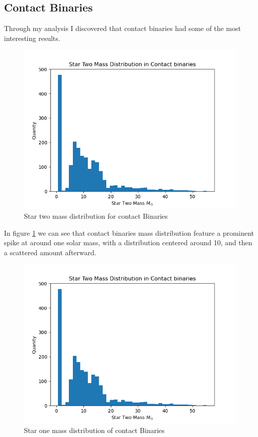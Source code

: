 \documentclass[12pt, a4paper]{article}
\begin{document}
        \subsection{\centering Contact Binaries}
            Through my analysis I discovered that contact binaries had some of the most interesting results. 
        \begin{figure}[H]
            \centering
            \includegraphics[scale = .6]{figs/GeneratedFigs/Contact binaries Star Two Mass Distribution.png}
            \caption{Star two mass distribution for contact Binaries}
            \label{contactBinaryStar2MassDistro}
        \end{figure}

        In figure \ref{contactBinaryStar2MassDistro} we can see that contact binaries mass distribution feature a prominent spike at around one solar mass, with a distribution centered around 10, and then a scattered amount afterward. 

        \begin{figure}[H]
            \centering
            \includegraphics[scale = .6]{figs/GeneratedFigs/Contact binaries Star Two Mass Distribution.png}
            \caption{Star one mass distribution of contact Binaries}
            \label{contactBinarStar1MassDistro}
        \end{figure}
\end{document}
